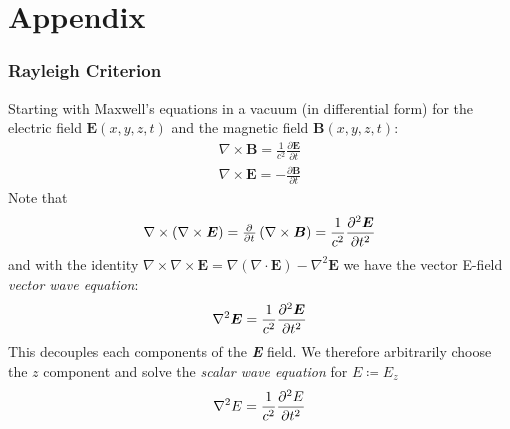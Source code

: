 %
%
%
%
%
%
%
%
%

\section{Appendix}\label{sec:appendix}
\localtableofcontents

\subsubsection{Rayleigh Criterion}

\newcommand*{\E}{\bm{E}}
\newcommand*{\B}{\bm{B}}
\newcommand*{\rr}{\bm{r}}
\newcommand*{\Ef}{\textit{\textbf{E}} }

Starting with Maxwell's equations in a vacuum (in differential form) for the electric field \(\E(x,y,z, t)\) and the magnetic field \(\B(x,y,z, t)\):
%
\begin{align}
    \nabla \times \B = \frac{1}{c^2} \frac{\partial \E}{\partial t} \\
    \nabla \times \E = - \frac{\partial \B}{\partial t} 
\end{align}
%
Note that 
%
\begin{equation}
    \nabla \times \left( \nabla \times \E \right) = \pd{}{t} \left( \nabla \times \B\right) = \frac{1}{c^2} \pdv[2]{\E}{t}
\end{equation}
%
and with the identity \(\nabla \times \nabla \times \E = \nabla (\nabla\cdot \E) - \nabla^2 \E\) we have the vector E-field \textit{vector wave equation}:
%
\begin{equation}
    \nabla^2 \E = \frac{1}{c^2} \pdv[2]{\E}{t}
\end{equation}
%
This decouples each components of the \textit{\textbf{E}} field. We therefore arbitrarily choose the \(z\) component and solve the \textit{scalar wave equation} for \(E \coloneqq E_z\)
%
\begin{equation}
    \nabla^2 E = \frac{1}{c^2} \pdv[2]{E}{t}\label{eqn:scalarwaveeqn}
\end{equation}

